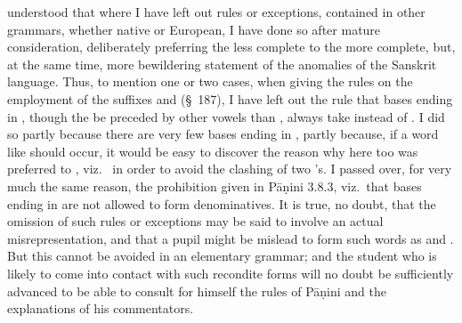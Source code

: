 understood that where I have left out rules or exceptions, contained in
other grammars, whether native or European, I have done so after mature
consideration, deliberately preferring the less complete to the more
complete, but, at the same time, more bewildering statement of the
anomalies of the Sanskrit language. Thus, to mention one or two cases,
when giving the rules on the employment of the suffixes  and
 (\S~187), I have left out the rule that bases ending in ,
though the  be preceded by other vowels than , always take
 instead of . I did so partly because there are very few
bases ending in , partly because, if a word like 
should occur, it would be easy to discover the reason why here too
 was preferred to , viz.\ %
in order to avoid the clashing of two 's.
%
I passed over, for very much the same reason, the prohibition given in
Pāṇini 3.8.3, viz.\ that bases ending in  are not allowed to form
denominatives.
It is true, no doubt, that the omission of such rules or exceptions may
be said to involve an actual misrepresentation, and that a pupil might
be mislead to form such words as  and . But
this cannot be avoided in an elementary grammar; and the student who is
likely to come into contact with such recondite forms will no doubt be
sufficiently advanced to be able to consult for himself the rules of
Pāṇini and the explanations of his commentators.

